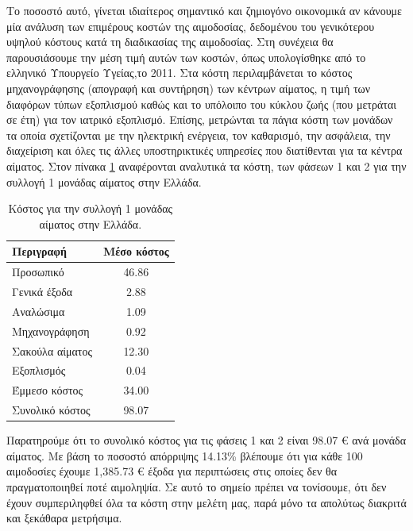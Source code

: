		Το ποσοστό αυτό, γίνεται ιδιαίτερος σημαντικό και ζημιογόνο οικονομικά αν κάνουμε μία ανάλυση των επιμέρους κοστών της αιμοδοσίας, δεδομένου του γενικότερου υψηλού κόστους κατά τη διαδικασίας της αιμοδοσίας. Στη συνέχεια θα παρουσιάσουμε την μέση τιμή αυτών των κοστών, όπως υπολογίσθηκε από το ελληνικό Υπουργείο Υγείας,το 2011\cite{Fragoulakis}. Στα κόστη περιλαμβάνεται το κόστος μηχανογράφησης (απογραφή και συντήρηση) των κέντρων αίματος, η τιμή των διαφόρων τύπων εξοπλισμού καθώς και το υπόλοιπο του κύκλου ζωής (που μετράται σε έτη) για τον ιατρικό εξοπλισμό. Επίσης, μετρώνται τα πάγια κόστη των μονάδων τα οποία σχετίζονται με την ηλεκτρική ενέργεια,  τον καθαρισμό, την ασφάλεια, την διαχείριση και όλες τις άλλες υποστηρικτικές υπηρεσίες που διατίθενται για τα κέντρα αίματος. Στον πίνακα \ref{tab:blood_collection_cost_greece} αναφέρονται αναλυτικά τα κόστη, των φάσεων 1 και 2 για την συλλογή 1 μονάδας αίματος στην Ελλάδα.
		
	\begin{table}[h]
		\centering
		\begin{tabular}{| l |c|}
		    \hline
		    \rowcolor{grayy}
		    \textbf{Περιγραφή} & \textbf{Μέσο κόστος}
		    \\ \hline
		     Προσωπικό & 46.86
		     \\ 
		     Γενικά έξοδα & 2.88
		     \\ 
		     Αναλώσιμα & 1.09
		     \\ 
		     Μηχανογράφηση & 0.92
		     \\
		     Σακούλα αίματος & 12.30
		     \\
		     Εξοπλισμός & 0.04
		     \\ 
		     Έμμεσο κόστος & 34.00
		     \\ \hline
		     Συνολικό κόστος & 98.07	
		     \\ \hline
		\end{tabular}
		\caption{Κόστος για την συλλογή 1 μονάδας αίματος στην Ελλάδα.}
		\label{tab:blood_collection_cost_greece}
	\end{table}
		
		Παρατηρούμε ότι το συνολικό κόστος για τις φάσεις 1 και 2 είναι 98.07 € ανά μονάδα αίματος.  Με βάση το ποσοστό απόρριψης 14.13\% βλέπουμε ότι για κάθε 100 αιμοδοσίες έχουμε 1,385.73 € έξοδα για περιπτώσεις στις οποίες δεν θα πραγματοποιηθεί ποτέ αιμοληψία. Σε αυτό το σημείο πρέπει να τονίσουμε, ότι δεν έχουν συμπεριληφθεί όλα τα κόστη στην μελέτη μας, παρά μόνο τα απολύτως διακριτά και ξεκάθαρα μετρήσιμα.
	
